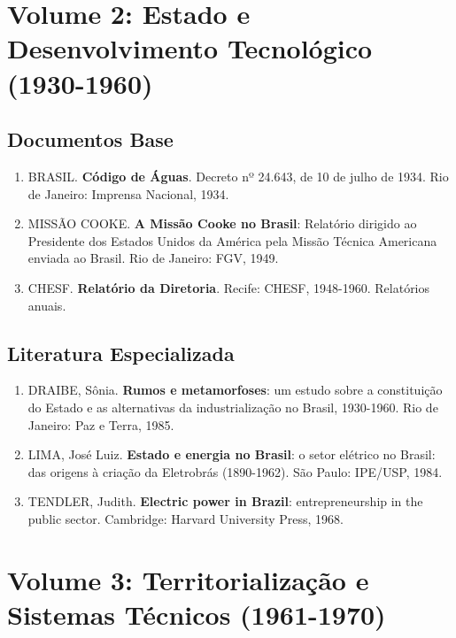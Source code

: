 \documentclass[12pt,a4paper]{report}
\begin{document}
\chapter*{Volume 2: Estado e Desenvolvimento Tecnológico (1930-1960)}

\section*{Documentos Base}
\begin{enumerate}[leftmargin=*]
    \item BRASIL. \textbf{Código de Águas}. Decreto nº 24.643, de 10 de julho de 1934. Rio de Janeiro: Imprensa Nacional, 1934.
    
    \item MISSÃO COOKE. \textbf{A Missão Cooke no Brasil}: Relatório dirigido ao Presidente dos Estados Unidos da América pela Missão Técnica Americana enviada ao Brasil. Rio de Janeiro: FGV, 1949.
    
    \item CHESF. \textbf{Relatório da Diretoria}. Recife: CHESF, 1948-1960. Relatórios anuais.
\end{enumerate}

\section*{Literatura Especializada}
\begin{enumerate}[leftmargin=*]
    \item DRAIBE, Sônia. \textbf{Rumos e metamorfoses}: um estudo sobre a constituição do Estado e as alternativas da industrialização no Brasil, 1930-1960. Rio de Janeiro: Paz e Terra, 1985.
    
    \item LIMA, José Luiz. \textbf{Estado e energia no Brasil}: o setor elétrico no Brasil: das origens à criação da Eletrobrás (1890-1962). São Paulo: IPE/USP, 1984.
    
    \item TENDLER, Judith. \textbf{Electric power in Brazil}: entrepreneurship in the public sector. Cambridge: Harvard University Press, 1968.
\end{enumerate}

\chapter*{Volume 3: Territorialização e Sistemas Técnicos (1961-1970)}
\end{document}
